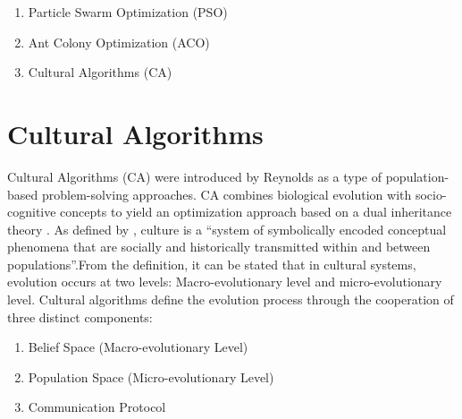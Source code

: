 \begin{enumerate}
	\item Particle Swarm Optimization (PSO)
	\item Ant Colony Optimization (ACO)
	\item Cultural Algorithms (CA)
\end{enumerate}
\section{Cultural Algorithms}
Cultural Algorithms (CA) were introduced by Reynolds as a type of population-based problem-solving approaches. CA combines biological evolution with socio-cognitive concepts to yield an optimization approach based on a dual inheritance theory \citet{reynolds1994introduction}. As defined by \citet{durham1991coevolution}, culture is a \enquote{system of symbolically encoded conceptual phenomena that are socially and historically transmitted within and between populations}.From the definition, it can be stated that in cultural systems, evolution occurs at two levels: Macro-evolutionary level and micro-evolutionary level. Cultural algorithms define the evolution process through the cooperation of three distinct components: 
\begin{enumerate}
	\item Belief Space (Macro-evolutionary Level)
	\item Population Space (Micro-evolutionary Level)
	\item Communication Protocol
\end{enumerate}
